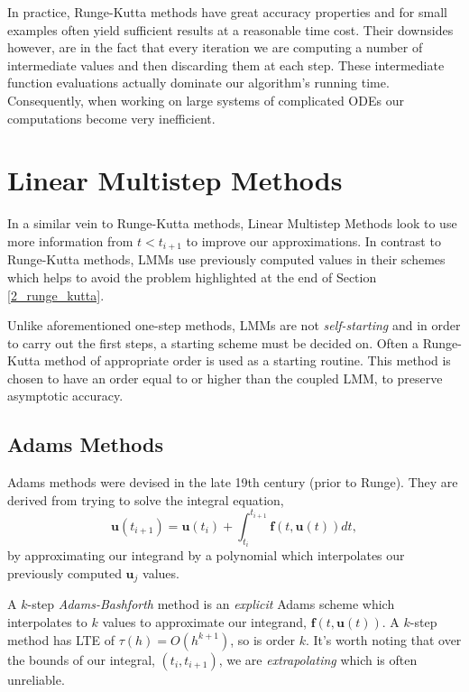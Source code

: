\documentclass[12pt, twoside]{report}
\theoremstyle{plain}
\theoremstyle{definition}
\theoremstyle{definition}
\begin{document}
            In practice, Runge-Kutta methods have great accuracy properties
            and for small examples often yield sufficient results at a 
            reasonable time cost. Their downsides however, are in the fact
            that every iteration we are computing a number of intermediate
            values and then discarding them at each step. These 
            intermediate function evaluations actually dominate our 
            algorithm's running time. Consequently, when working on large 
            systems of complicated ODEs our computations become very 
            inefficient. 

    \section{Linear Multistep Methods}
    \label{2_lmms}
        In a similar vein to Runge-Kutta methods, Linear Multistep Methods 
        look to use more information from $t<t_{i+1}$ to improve our 
        approximations. In contrast to Runge-Kutta methods, LMMs use 
        previously computed values in their schemes which helps to avoid the problem highlighted at the end of Section \ref{2_runge_kutta}.

        Unlike aforementioned one-step methods, LMMs are not 
        \textit{self-starting} and in order to carry out the first steps, a 
        starting scheme must be decided on. Often a Runge-Kutta method of
        appropriate order is used as a starting routine. This method is chosen
        to have an order equal to or higher than the coupled LMM, to preserve
        asymptotic accuracy.

        \subsection{Adams Methods}
        \label{2_adams}
            Adams methods were devised in the late 19th century (prior to 
            Runge). They are derived from trying to solve the integral 
            equation,
            \begin{equation}
            \label{eq:2_int_equation}
                \mathbf{u}(t_{i+1}) = \mathbf{u}(t_i) + \int_{t_i}^{t_{i+1}}
                \mathbf{f}(t, \mathbf{u}(t)) dt,
            \end{equation}
            by approximating our integrand by a polynomial which interpolates
            our previously computed $\mathbf{u}_j$ values.

            A $k$-step \textit{Adams-Bashforth} method is an \textit{explicit}
            Adams scheme which interpolates to $k$ values to approximate 
            our integrand, $\mathbf{f}(t, \mathbf{u}(t))$. A $k$-step method 
            has LTE of $\tau(h)=O(h^{k+1})$, so is order $k$. It's worth 
            noting that over the bounds of our integral, $(t_i, t_{i+1})$, we 
            are \textit{extrapolating} which is often unreliable.
\end{document}
